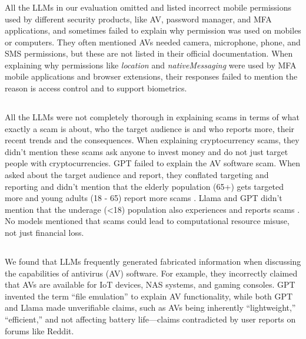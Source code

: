 \if {}
    \subsubsection{\Permissions} 
\fi
    All the LLMs in our evaluation omitted and listed incorrect mobile permissions used by different security products, like AV, password manager, and MFA applications, and sometimes failed to explain why permission was used on mobiles or computers. They often mentioned AVs needed camera, microphone, phone, and SMS permissions, but these are not listed in their official documentation. When explaining why permissions like \textit{location} and \textit{nativeMessaging} were used by MFA mobile applications and browser extensions, their responses failed to mention the reason is access control and to support biometrics. 


\if {}
    \subsection{\Scams}
\fi

\if {}
    \subsubsection{\Scams}
\fi
    All the LLMs were not completely thorough in explaining scams in terms of what exactly a scam is about, who the target audience is and who reports more, their recent trends and the consequences. When explaining cryptocurrency scams, they didn't mention these scams ask anyone to invest money and do not just target people with cryptocurrencies. GPT failed to explain the AV software scam. When asked about the target audience and report, they conflated targeting and reporting and didn't mention that the elderly population (65+) gets targeted more and young adults (18 - 65) report more scams \cite{ftc_scams_all_ages_2022}. Llama and GPT didn't mention that the underage (\textless18) population also experiences and reports scams \cite{ftc_consumer_sentinal_scam_by_age_2023}. No models mentioned that scams could lead to computational resource misuse, not just financial loss.


\if {}
    \subsection{\MakingUpFactsAV}
\fi

\if {}
    \subsubsection{\MakingUpFactsAV}
\fi
    We found that LLMs frequently generated fabricated information when discussing the capabilities of antivirus (AV) software. For example, they incorrectly claimed that AVs are available for IoT devices, NAS systems, and gaming consoles. GPT invented the term “file emulation” to explain AV functionality, while both GPT and Llama made unverifiable claims, such as AVs being inherently “lightweight,” “efficient,” and not affecting battery life—claims contradicted by user reports on forums like Reddit.

